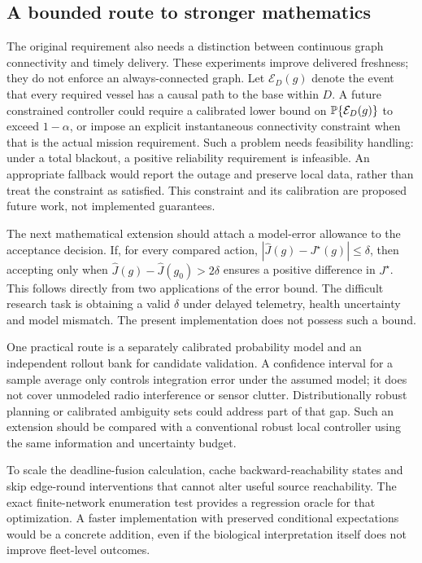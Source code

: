 \subsection{A bounded route to stronger mathematics}
The original requirement also needs a distinction between continuous graph
connectivity and timely delivery. These experiments improve delivered freshness;
they do not enforce an always-connected graph. Let $\mathcal E_D(g)$ denote the
event that every required vessel has a causal path to the base within $D$.
A future constrained controller could require a calibrated lower bound on
$\mathbb P\{\mathcal E_D(g)\}$ to exceed $1-\alpha$, or impose an explicit instantaneous connectivity constraint
when that is the actual mission requirement. Such a problem needs feasibility
handling: under a total blackout, a positive reliability requirement is
infeasible. An appropriate fallback would report the outage and preserve local
data, rather than treat the constraint as satisfied. This constraint and its
calibration are proposed future work, not implemented guarantees.

The next mathematical extension should attach a model-error allowance to
the acceptance decision. If, for every compared action,
$|\widehat J(g)-J^\star(g)|\leq\delta$, then accepting only when
$\widehat J(g)-\widehat J(g_0)>2\delta$ ensures a positive difference in
$J^\star$. This follows directly from two applications of the error bound.
The difficult research task is obtaining a valid $\delta$ under delayed
telemetry, health uncertainty and model mismatch. The present implementation
does not possess such a bound.

One practical route is a separately calibrated probability model and an
independent rollout bank for candidate validation. A confidence interval for a
sample average only controls integration error under the assumed model; it
does not cover unmodeled radio interference or sensor clutter.
Distributionally robust planning or calibrated ambiguity sets could address
part of that gap. Such an extension should be compared with a conventional
robust local controller using the same information and uncertainty budget.

To scale the deadline-fusion calculation, cache backward-reachability states
and skip edge-round interventions that cannot alter useful source reachability.
The exact finite-network enumeration test provides a regression oracle for
that optimization. A faster implementation with preserved conditional
expectations would be a concrete addition, even if the biological interpretation
itself does not improve fleet-level outcomes.


